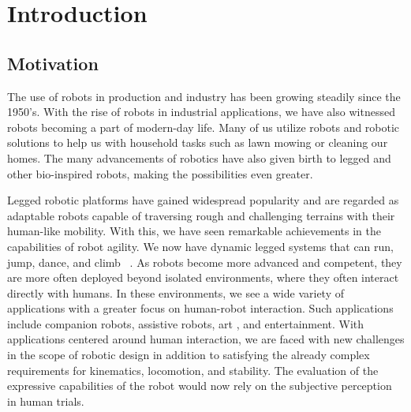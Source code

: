 \chapter{Introduction}

\section{Motivation}
The use of robots in production and industry has been growing steadily since the 1950's\cite{hockstein_history_2007}. With the rise of robots in industrial applications, we have also witnessed robots becoming a part of modern-day life. Many of us utilize robots and robotic solutions to help us with household tasks such as lawn mowing or cleaning our homes. The many advancements of robotics have also given birth to legged and other bio-inspired robots, making the possibilities even greater.

Legged robotic platforms have gained widespread popularity and are regarded as adaptable robots capable of traversing rough and challenging terrains with their human-like mobility. With this, we have seen remarkable achievements in the capabilities of robot agility. We now have dynamic legged systems that can run, jump, dance, and climb \ \cite{8913831}\cite{doi:10.1126/scirobotics.adi7566}. 
As robots become more advanced and competent, they are more often deployed beyond isolated environments, where they often interact directly with humans. In these environments, we see a wide variety of applications with a greater focus on human-robot interaction. Such applications include companion robots\cite{companion_1}\cite{companion_2}, assistive robots\cite{Assistive}, art \cite{sun2016cant}, and entertainment\cite{Disney}. With applications centered around human interaction, we are faced with new challenges in the scope of robotic design in addition to satisfying the already complex requirements for kinematics, locomotion, and stability. The evaluation of the expressive capabilities of the robot would now rely on the subjective perception in human trials.

